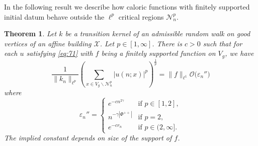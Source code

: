 \documentclass[11pt]{amsart}
\newcommand{\calO}{\mathcal{O}}
\newcommand{\scrX}{\mathscr{X}}
\newcommand{\scrN}{\mathscr{N}}
\theoremstyle{plain}
\newcounter{thm}
\newtheorem{theorem}{Theorem}[section]
\theoremstyle{definition}
\numberwithin{equation}{section}
\begin{document}
In the following result we describe how caloric functions with finitely supported initial datum behave outside the $\ell^p$ 
critical regions $\scrN_n^p$.
\begin{theorem} 
	\label{thm:8}
	Let $k$ be a transition kernel of an admissible random walk on good vertices of an affine building $\scrX$.
	Let $p \in [1, \infty]$. There is $c > 0$ such that for each $u$ satisfying \eqref{eq:71} with $f$ being a finitely
	supported function on $V_g$, we have
	\[
		\frac{1}{\| k_n \|_{\ell^p}}
		\left(
		\sum_{x \in V_g \smallsetminus \scrN_n^p} |u(n; x)|^p
		\right)^{\frac{1}{p}}
		= \|f\|_{\ell^1} \calO\big( \varepsilon_n''\big)
	\]
	where 
	\[
		\varepsilon_n'' =
		\begin{cases}
			e^{-cn^{2\gamma}} &\text{if } p \in [1, 2], \\
			n^{-\gamma|\Phi^{++}|} &\text{if } p=2,\\
			e^{-c r_n} &\text{if } p\in (2, \infty].
		\end{cases}
	\]
	The implied constant depends on size of the support of $f$.
\end{theorem}
\end{document}
